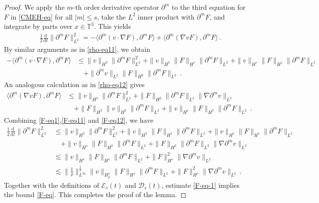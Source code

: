 \documentclass[reqno,11pt]{amsart}
\numberwithin{equation}{section}
\def\p{\partial}
\def\d{\mathrm{d}}
\begin{document}
\begin{proof}

We apply the $m$-th order derivative operator $\partial^m$ to the third equation for $F$ in \eqref{CMEH-eq} for all $|m| \leq s$, take the $L^2$ inner product with $\partial^{m} F$, and integrate by parts over $x \in \mathbb{T}^3$. This yields
 \begin{equation}\label{F-eq1}
	\begin{aligned}
		&\tfrac{1}{2} \tfrac{\d}{\d t} \|\partial^{m}F\|^{2}_{L^{2}} =-\langle \partial^{m}(v \cdot \nabla F),\p^m F \rangle+\langle\p^m(\nabla vF),\p^m F \rangle\,.
	\end{aligned}
\end{equation}
By similar arguments as in \eqref{rho-eq11}, we obtain
 \begin{equation}\label{F-eq11}
	\begin{aligned}
		-\langle \partial^{m}(v \cdot \nabla F),\p^m F \rangle
		& \leq \|v\|_{H^3}\|\p^m F\|^2_{L^2}+\|v\|_{H^3}\|F\|_{H^s}\|\p^mF\|_{L^2}	+\|v\|_{H^s}\|F\|_{H^s}\|\p^m F\|_{L^2}\\
		&\quad+	\|\p^m v\|_{L^2}\|F\|_{H^3}\|\p^mF\|_{L^2}	\,.
	\end{aligned}
\end{equation}
An analogous calculation as in \eqref{rho-eq12} gives
 \begin{equation}\label{F-eq12}
	\begin{aligned}
	\langle\p^m(\nabla vF),\p^m F \rangle & \leq \|v\|_{H^3}\|\p^mF\|^2_{L^2}+\|F\|_{H^2}\|\p^mF\|_{L^2}\|\nabla\p^m v\|_{L^2}	\\
		&\quad+\|F\|_{H^3}	\| v\|_{H^3}\|\p^mF\|_{L^2}+\|v\|_{H^s}\|F\|_{H^3}\|\p^mF\|_{L^2}	\,.
	\end{aligned}
\end{equation}
Combining \eqref{F-eq1},\eqref{F-eq11} and \eqref{F-eq12}, we have
\begin{equation}\label{F-eq-1}
	\begin{aligned}
		\tfrac{1}{2} \tfrac{\d}{\d t} \|\partial^{m}F\|^{2}_{L^{2}} 
	& \leq \|v\|_{H^3}\|\p^m F\|^2_{L^2}+\|v\|_{H^3}\|F\|_{H^s}\|\p^mF\|_{L^2}+\|v\|_{H^s}\|F\|_{H^s}\|\p^m F\|_{L^2}		\\
		&\quad+\|v\|_{H^s}\|F\|_{H^3}\|\p^m F\|_{L^2}+ \|F\|_{H^2}\|\p^m F\|_{L^2}\|\nabla\p^m v\|_{L^2}	\\
		&\lesssim\|v\|_{H^s}\|F\|_{H^s}\|\p^m F\|_{L^2}+\|F\|^2_{H^s}\|\nabla\p^mv\|_{L^2}\\
		&\lesssim \|\tfrac{1}{\rho}\|^{\tfrac{1}{2}}_{L^\infty}\|v\|_{H^s_\rho}\|F\|_{H^s}\|\p^m F\|_{L^2}+\|F\|^2_{H^s}\|\nabla\p^mv\|_{L^2}
		\,.
	\end{aligned}
\end{equation}
Together with the definitions of $\mathcal{E}_s(t)$ and $\mathcal{D}_s(t)$, estimate \eqref{F-eq-1} implies the bound \eqref{F-eq}. This completes the proof of the lemma.
\end{proof}
\end{document}

